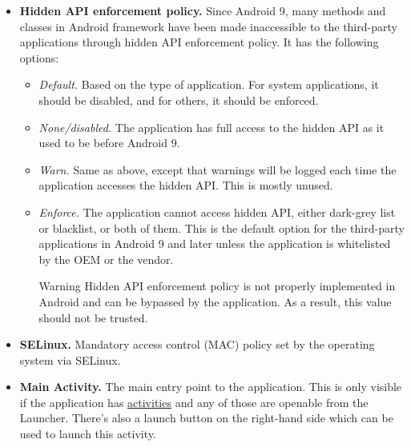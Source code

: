 \begin{itemize}
\begin{itemize}
        \item \textbf{Hidden API enforcement policy.} Since Android 9, many methods and classes in Android framework
        have been made inaccessible to the third-party applications through hidden API enforcement policy. It has the
        following options:
        \begin{itemize}
            \item \textit{Default.} Based on the type of application. For system applications, it should be disabled,
            and for others, it should be enforced.
            \item \textit{None/disabled.} The application has full access to the hidden API as it used to be before
            Android 9.
            \item \textit{Warn.} Same as above, except that warnings will be logged each time the application accesses
            the hidden API. This is mostly unused.
            \item \textit{Enforce.} The application cannot access hidden API, either dark-grey list or blacklist, or
            both of them. This is the default option for the third-party applications in Android 9 and later unless the
            application is whitelisted by the OEM or the vendor.
            \begin{warning}{Warning}
                Hidden API enforcement policy is not properly implemented in Android and can be bypassed by the
                application. As a result, this value should not be trusted.
            \end{warning}
        \end{itemize}

        \item \textbf{SELinux.} Mandatory access control (MAC) policy set by the operating system via SELinux.

        \item \textbf{Main Activity.} The main entry point to the application. This is only visible if the application has
        \hyperref[subsubsec:activities]{activities} and any of those are openable from the Launcher. There's also a
        launch button on the right-hand side which can be used to launch this activity.
    \end{itemize}
\end{itemize}

